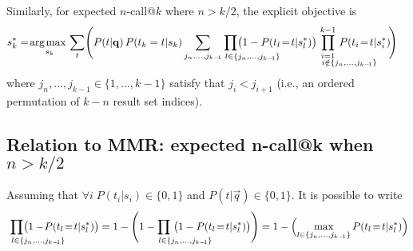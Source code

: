 Similarly, for expected $n$-call@$k$ where $n \! > \! k/2$, the explicit objective is
\begin{align}
  & s_k^* = \argmax_{s_k} \sum_t \Biggl( P(t|\vec{q}) \, P(t_k=t|s_k) \sum_{j_n, \dots, j_{k-\!1}} \hspace{-14mm} \prod_{\hspace{14.5mm} l \in \{j_n, \dots, j_{k-\!1}\}} \hspace{-14mm} \bigl(1 - P(t_l\!=\!t|s_l^*) \bigr) \hspace{-13mm} \prod_{\substack{i=1 \\ \hspace{14mm} i \notin \{j_n, \dots, j_{k-\!1}\}}}^{k-1} \hspace{-13mm} P(t_i\!=\!t|s_i^*) \!\Biggr) \label{eq.ncall.alt2}
\end{align}
where $j_n, \dots, j_{k-1} \in \{1,\ldots,k-1\}$ satisfy 
that $j_i < j_{i+1}$ (i.e.,
an ordered permutation of $k-n$ result set indices).

\subsection{Relation to MMR: expected n-call@k when $n>k/2$}

Assuming that $\forall i \; P(t_i|s_i) \in \{0,1\}$ and $P(t|\vec{q}) \in \{0,1\}$. It is possible to write
\begin{align*}
  \hspace{-13mm} \prod_{\hspace{14.5mm} l \in \{j_n, \dots, j_{k-\!1}\}} \hspace{-14mm} \bigl( 1 - \!P(t_l\!=\!t|s_l^*) \bigr) 
  = 1 - \Biggl( 1 - \hspace{-14mm} \prod_{\hspace{14.5mm} l \in \{j_n, \dots, j_{k-\!1}\}} \hspace{-13mm} \bigl( 1 - P(t_l\!=\!t|s_l^*) \bigr) \Biggr)
  = 1 - \Bigl( \max_{l \in \{j_n, \dots, j_{k-\!1}\}} P(t_l\!=\!t|s_l^*) \Bigr)
\end{align*}

